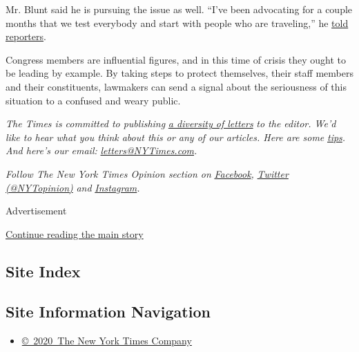 Mr. Blunt said he is pursuing the issue as well. ``I've been advocating
for a couple months that we test everybody and start with people who are
traveling,'' he
\href{https://www.rollcall.com/2020/07/29/louie-gohmert-coronavirus-capitol/}{told
reporters}.

Congress members are influential figures, and in this time of crisis
they ought to be leading by example. By taking steps to protect
themselves, their staff members and their constituents, lawmakers can
send a signal about the seriousness of this situation to a confused and
weary public.

\emph{The Times is committed to publishing}
\href{https://www.nytimes3xbfgragh.onion/2019/01/31/opinion/letters/letters-to-editor-new-york-times-women.html}{\emph{a
diversity of letters}} \emph{to the editor. We'd like to hear what you
think about this or any of our articles. Here are some}
\href{https://help.nytimes3xbfgragh.onion/hc/en-us/articles/115014925288-How-to-submit-a-letter-to-the-editor}{\emph{tips}}\emph{.
And here's our email:}
\href{mailto:letters@NYTimes.com}{\emph{letters@NYTimes.com}}\emph{.}

\emph{Follow The New York Times Opinion section on}
\href{https://www.facebookcorewwwi.onion/nytopinion}{\emph{Facebook}}\emph{,}
\href{http://twitter.com/NYTOpinion}{\emph{Twitter (@NYTopinion)}}
\emph{and}
\href{https://www.instagram.com/nytopinion/}{\emph{Instagram}}\emph{.}

Advertisement

\protect\hyperlink{after-bottom}{Continue reading the main story}

\hypertarget{site-index}{%
\subsection{Site Index}\label{site-index}}

\hypertarget{site-information-navigation}{%
\subsection{Site Information
Navigation}\label{site-information-navigation}}

\begin{itemize}
\tightlist
\item
  \href{https://help.nytimes3xbfgragh.onion/hc/en-us/articles/115014792127-Copyright-notice}{©~2020~The
  New York Times Company}
\end{itemize}

